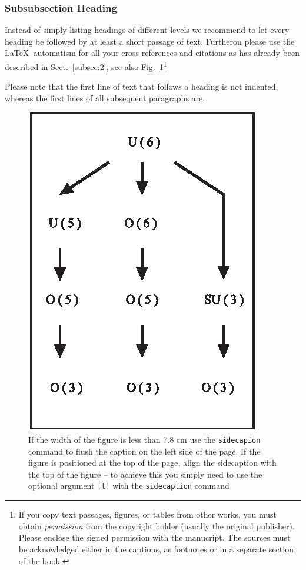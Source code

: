 \subsubsection{Subsubsection Heading}
Instead of simply listing headings of different levels we recommend to let every heading be followed by at least a short passage of text. Furtheron please use the \LaTeX\ automatism for all your cross-references and citations as has already been described in Sect.~\ref{subsec:2}, see also Fig.~\ref{fig:1}\footnote{If you copy text passages, figures, or tables from other works, you must obtain \textit{permission} from the copyright holder (usually the original publisher). Please enclose the signed permission with the manucript. The sources must be acknowledged either in the captions, as footnotes or in a separate section of the book.}

Please note that the first line of text that follows a heading is not indented, whereas the first lines of all subsequent paragraphs are.

%
\begin{figure}[b]
\sidecaption
\includegraphics[scale=.65]{figure}
%
%
\caption{If the width of the figure is less than 7.8 cm use the \texttt{sidecapion} command to flush the caption on the left side of the page. If the figure is positioned at the top of the page, align the sidecaption with the top of the figure -- to achieve this you simply need to use the optional argument \texttt{[t]} with the \texttt{sidecaption} command}
\label{fig:1}       %
\end{figure}



